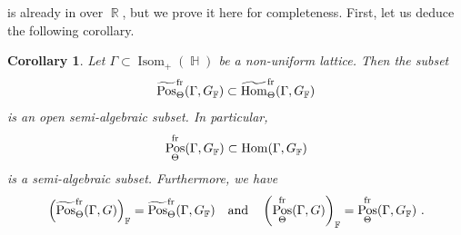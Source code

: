 \documentclass{amsart}
\theoremstyle{plain}
\newtheorem{corollary}[proposition]{Corollary}
\theoremstyle{definition}
\DeclareMathOperator{\Hom}{Hom}
\DeclareMathOperator{\Isom}{Isom}
\DeclareMathOperator{\Pos}{Pos}
\DeclareMathOperator{\Fb}{{\mathbb{F}}}
\DeclareMathOperator{\Hb}{\mathbb{H}}
\DeclareMathOperator{\Rb}{{\mathbb{R}}}
\newcommand{\fr}{\textnormal{fr}}
\newcommand{\1}{\mathbf{1}}
\begin{document}
 is already in \cite[Proposition 6.4]{GRW} over $\Rb$, but we prove it here for completeness.
First, let us deduce the following corollary. 

\begin{corollary}
\label{corollary : positively framed repr semi-algebraic}
    Let $\Gamma \subset \Isom_+(\Hb)$ be a non-uniform lattice. Then the subset 
    \[\widetilde{\Pos}_\Theta^{\fr}(\Gamma,G_{\Fb})\subset \widetilde{\Hom}_\Theta^{\fr}(\Gamma,G_{\Fb})\]
    is an open semi-algebraic subset. In particular, 
    \[\Pos_\Theta^{\fr}(\Gamma,G_{\Fb})\subset \Hom(\Gamma,G_{\Fb})\]
    is a semi-algebraic subset. Furthermore, we have
    \[\left(\widetilde{\Pos}_\Theta^{\fr}(\Gamma,G)\right)_{\Fb}=\widetilde{\Pos}_\Theta^{\fr}(\Gamma,G_{\Fb})\quad\text{and}\quad\left(\Pos_\Theta^{\fr}(\Gamma,G)\right)_{\Fb}=\Pos_\Theta^{\fr}(\Gamma,G_{\Fb})~.\]
\end{corollary}
\end{document}
